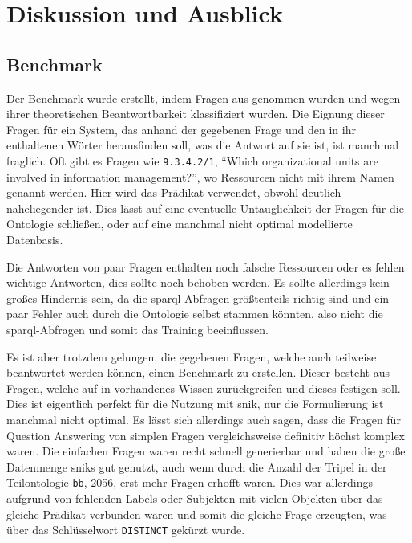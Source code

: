 \chapter{Diskussion und Ausblick}\label{ch:discussion}

\section{Benchmark}

Der Benchmark wurde erstellt, indem Fragen aus \citet{bb} genommen wurden und wegen ihrer theoretischen Beantwortbarkeit klassifiziert wurden.
Die Eignung dieser Fragen für ein System, das anhand der gegebenen Frage und den in ihr enthaltenen Wörter herausfinden soll, was die Antwort auf sie ist, ist manchmal fraglich.
Oft gibt es Fragen wie \texttt{9.3.4.2/1}, \enquote{Which organizational units are involved in information management?}, wo Ressourcen nicht mit ihrem Namen genannt werden.
Hier wird das Prädikat  verwendet, obwohl  deutlich naheliegender ist.
Dies lässt auf eine eventuelle Untauglichkeit der Fragen für die Ontologie schließen, oder auf eine manchmal nicht optimal modellierte Datenbasis.

Die Antworten von paar Fragen enthalten noch falsche Ressourcen oder es fehlen wichtige Antworten, dies sollte noch behoben werden.
Es sollte allerdings kein großes Hindernis sein, da die \ac{sparql}-Abfragen größtenteils richtig sind und ein paar Fehler auch durch die Ontologie selbst stammen könnten,
also nicht die \ac{sparql}-Abfragen und somit das Training beeinflussen.

Es ist aber trotzdem gelungen, die gegebenen Fragen, welche auch teilweise beantwortet werden können, einen Benchmark zu erstellen.
Dieser besteht aus Fragen, welche auf in \citet{bb} vorhandenes Wissen zurückgreifen und dieses festigen soll.
Dies ist eigentlich perfekt für die Nutzung mit \ac{snik}, nur die Formulierung ist manchmal nicht optimal.
Es lässt sich allerdings auch sagen, dass die Fragen für Question Answering von simplen Fragen vergleichsweise definitiv höchst komplex waren.
Die einfachen Fragen waren recht schnell generierbar und haben die große Datenmenge \ac{snik}s gut genutzt,
auch wenn durch die Anzahl der Tripel in der Teilontologie \texttt{bb}, 2056, erst mehr Fragen erhofft waren.%
Dies war allerdings aufgrund von fehlenden Labels oder Subjekten mit vielen Objekten über das gleiche Prädikat verbunden waren und somit die gleiche Frage erzeugten,
was über das Schlüsselwort \texttt{DISTINCT} gekürzt wurde.

